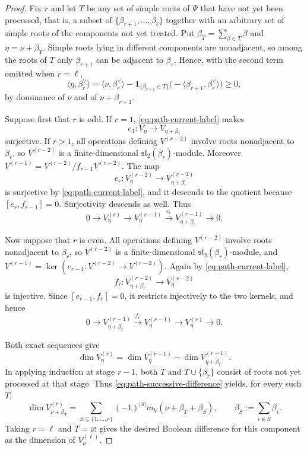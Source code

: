 \documentclass[11pt]{article}
\theoremstyle{definition}
\theoremstyle{remark}
\begin{document}
\begin{proof}
Fix $r$ and let $T$ be any set of simple roots of $\Psi$ that have not yet
been processed, that is, a subset of $\{\beta_{r+1},\ldots,\beta_\ell\}$
together with an arbitrary set of simple roots of the components not yet
treated.  Put $\beta_T=\sum_{\beta\in T}\beta$ and $\eta=\nu+\beta_T$.  Simple
roots lying in different components are nonadjacent, so among the roots of $T$
only $\beta_{r+1}$ can be adjacent to $\beta_r$.  Hence, with the second term
omitted when $r=\ell$,
\begin{equation}\label{eq:path-current-label}
 \langle\eta,\beta_r^\vee\rangle
   =\langle\nu,\beta_r^\vee\rangle
     -\mathbf 1_{\{\beta_{r+1}\in T\}}
        \bigl(-\langle\beta_{r+1},\beta_r^\vee\rangle\bigr)
   \ge0,
\end{equation}
by dominance of $\nu$ and of $\nu+\beta_{r+1}$.

Suppose first that $r$ is odd.  If $r=1$, \eqref{eq:path-current-label} makes
\[
 e_1:V_\eta\longrightarrow V_{\eta+\beta_1}
\]
surjective.  If $r>1$, all operations defining $V^{(r-2)}$ involve roots nonadjacent to
$\beta_r$, so $V^{(r-2)}$ is a finite-dimensional
$\mathfrak{sl}_2(\beta_r)$-module.  Moreover
$V^{(r-1)}=V^{(r-2)}/f_{r-1}V^{(r-2)}$.  The map
\[
 e_r:V^{(r-2)}_\eta\longrightarrow
       V^{(r-2)}_{\eta+\beta_r}
\]
is surjective by \eqref{eq:path-current-label}, and it descends to the
quotient because $[e_r,f_{r-1}]=0$.  Surjectivity descends as well.  Thus
\begin{equation}\label{eq:path-kernel-exact}
 0\longrightarrow V^{(r)}_\eta
 \longrightarrow V^{(r-1)}_\eta
 \xrightarrow{\ e_r\ }V^{(r-1)}_{\eta+\beta_r}
 \longrightarrow0 .
\end{equation}

Now suppose that $r$ is even.  All operations defining $V^{(r-2)}$ involve
roots nonadjacent to $\beta_r$, so $V^{(r-2)}$ is a finite-dimensional
$\mathfrak{sl}_2(\beta_r)$-module, and
$V^{(r-1)}=\ker(e_{r-1}:V^{(r-2)}\to V^{(r-2)})$.  Again by
\eqref{eq:path-current-label},
\[
 f_r:V^{(r-2)}_{\eta+\beta_r}\longrightarrow V^{(r-2)}_\eta
\]
is injective.  Since $[e_{r-1},f_r]=0$, it restricts injectively to the two
kernels, and hence
\begin{equation}\label{eq:path-quotient-exact}
 0\longrightarrow V^{(r-1)}_{\eta+\beta_r}
 \xrightarrow{\ f_r\ }V^{(r-1)}_\eta
 \longrightarrow V^{(r)}_\eta
 \longrightarrow0 .
\end{equation}

Both exact sequences give
\begin{equation}\label{eq:path-successive-difference}
 \dim V^{(r)}_\eta
   =\dim V^{(r-1)}_\eta
      -\dim V^{(r-1)}_{\eta+\beta_r}.
\end{equation}
In applying induction at stage $r-1$, both $T$ and
$T\cup\{\beta_r\}$ consist of roots not yet processed at that stage.
Thus \eqref{eq:path-successive-difference} yields, for every such $T$,
\[
 \dim V^{(r)}_{\nu+\beta_T}
   =\sum_{S\subseteq\{1,\ldots,r\}}(-1)^{|S|}
      m_V(\nu+\beta_T+\beta_S),
 \qquad \beta_S:=\sum_{i\in S}\beta_i.
\]
Taking $r=\ell$ and $T=\varnothing$ gives the desired Boolean difference for
this component as the dimension of $V^{(\ell)}_\nu$.


\end{proof}
\end{document}
